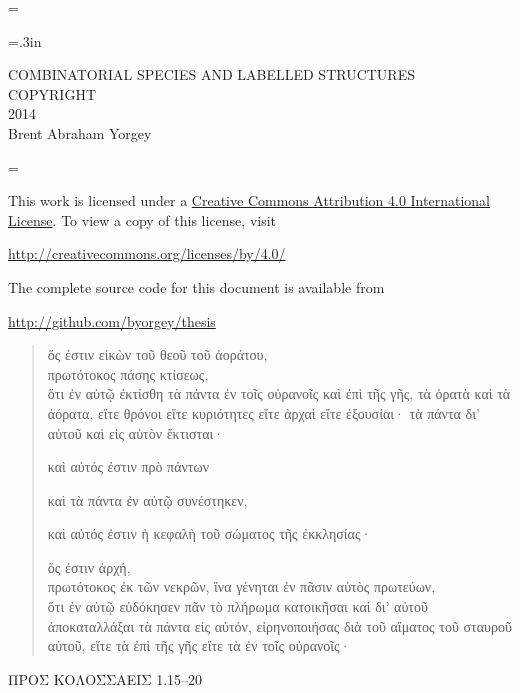 \documentclass[12pt,oneside]{book}
\newcommand{\Title}{COMBINATORIAL SPECIES AND LABELLED STRUCTURES}
\begin{document}
\normalsize\parskip=\oldparskip

\newpage

\thispagestyle{empty}
\begin{pagecentered}
\doublespaced
\parskip=.3in

\Title \\
COPYRIGHT \\
2014 \\
Brent Abraham Yorgey \bigskip

\singlespaced
\parskip=\oldparskip

This work is licensed under a
\href{http://creativecommons.org/licenses/by/4.0/}{Creative Commons
  Attribution 4.0 International License}.  To view a copy of this
license, visit \bigskip

\url{http://creativecommons.org/licenses/by/4.0/} \bigskip

The complete source code for this document is available from \bigskip

\url{http://github.com/byorgey/thesis}
\end{pagecentered}

\newpage

\begin{pagecentered}

\ifgreek
%



\begingroup
{} \large

\begin{verse}
ὅς ἐστιν εἰκὼν τοῦ θεοῦ τοῦ ἀοράτου, \\
πρωτότοκος πάσης κτίσεως, \\
ὅτι ἐν αὐτῷ ἐκτίσθη τὰ πάντα ἐν τοῖς οὐρανοῖς καὶ ἐπὶ τῆς γῆς, τὰ
ὁρατὰ καὶ τὰ ἀόρατα, εἴτε θρόνοι εἴτε κυριότητες εἴτε ἀρχαὶ εἴτε
ἐξουσίαι· τὰ πάντα δι’ αὐτοῦ καὶ εἰς αὐτὸν ἔκτισται·

\vin καὶ αὐτός ἐστιν πρὸ πάντων

\vin \vin καὶ τὰ πάντα ἐν αὐτῷ συνέστηκεν,

\vin καὶ αὐτός ἐστιν ἡ κεφαλὴ τοῦ σώματος τῆς ἐκκλησίας·

ὅς ἐστιν ἀρχή, \\
πρωτότοκος ἐκ τῶν νεκρῶν, ἵνα γένηται ἐν πᾶσιν αὐτὸς πρωτεύων, \\
ὅτι ἐν αὐτῷ εὐδόκησεν πᾶν τὸ πλήρωμα κατοικῆσαι καὶ δι’ αὐτοῦ
ἀποκαταλλάξαι τὰ πάντα εἰς αὐτόν, εἰρηνοποιήσας διὰ τοῦ αἵματος τοῦ
σταυροῦ αὐτοῦ, εἴτε τὰ ἐπὶ τῆς γῆς εἴτε τὰ ἐν τοῖς οὐρανοῖς· \bigskip
\end{verse}

\normalsize \hfill ΠΡΟΣ ΚΟΛΟΣΣΑΕΙΣ 1.15--20

\endgroup
\fi

\end{pagecentered}
\end{document}
